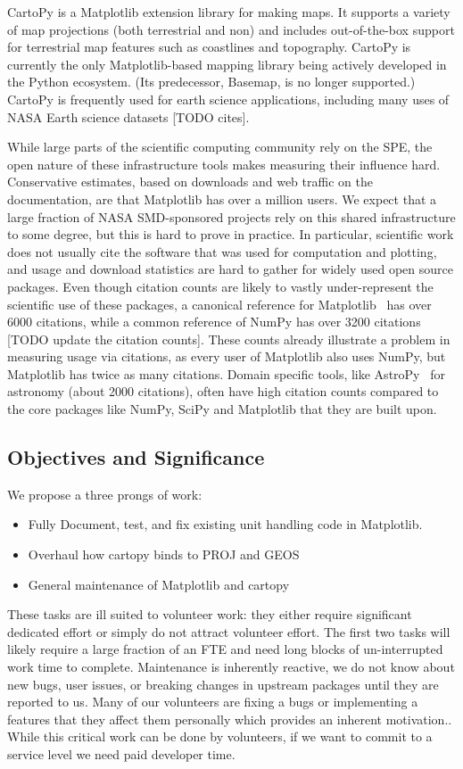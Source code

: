 \documentclass[12pt]{article}
\numberwithin{page}{section}
\begin{document}
CartoPy is a Matplotlib extension library for making maps.
It supports
a variety of map projections (both terrestrial and non) and includes
out-of-the-box support for terrestrial map
features such as coastlines and topography.
CartoPy is currently the only Matplotlib-based mapping
library being actively developed in the
Python ecosystem. (Its predecessor, Basemap, is no longer supported.)
CartoPy is frequently used for earth science
applications, including many uses of NASA Earth science datasets [TODO cites].


While large parts of the scientific computing community rely on the
SPE, the open nature of these infrastructure tools makes measuring
their influence hard.  Conservative estimates, based on downloads and
web traffic on the documentation, are that Matplotlib has over a
million users.  We expect that a large fraction of NASA SMD-sponsored
projects rely on this shared infrastructure to some degree, but this
is hard to prove in practice.  In particular, scientific work does not
usually cite the software that was used for computation and plotting, and usage and
download statistics are hard to gather for widely used open source
packages.  Even though citation counts are likely to vastly
under-represent the scientific use of these packages, a canonical reference for
Matplotlib~\cite{Hunter:2007} has over 6000 citations, while a common
reference of NumPy\cite{walt2011numpy} has over 3200 citations [TODO
  update the citation counts]. These counts already illustrate a
problem in measuring usage via citations, as every user of
Matplotlib also uses NumPy, but Matplotlib has twice as many
citations.  Domain specific tools, like
AstroPy~\cite{robitaille2013astropy} for astronomy (about 2000
citations), often have high citation counts compared to the core
packages like NumPy, SciPy and Matplotlib that they are built upon.


\subsection{Objectives and Significance}
We propose a three prongs of work:
\begin{itemize}
\item Fully Document, test, and fix existing unit handling code in Matplotlib.
\item Overhaul how cartopy binds to PROJ and GEOS
\item General maintenance of Matplotlib and cartopy
\end{itemize}
These tasks are ill suited to volunteer work: they either require
significant dedicated effort or simply do not attract volunteer
effort.  The first two tasks will likely require a large fraction of
an FTE and need long blocks of un-interrupted work time to complete.
Maintenance is inherently reactive, we do not know about new bugs,
user issues, or breaking changes in upstream packages until they are
reported to us.  Many of our volunteers are fixing a bugs or
implementing a features that they affect them personally which
provides an inherent motivation..  While this critical work can be
done by volunteers, if we want to commit to a service level we need
paid developer time.
\end{document}
